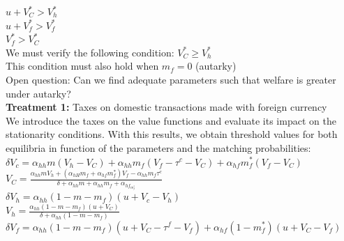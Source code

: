$u + V _ { C } ^* > V_ { h }^ { * }$\\

$u + V _ { f  }^ { * } > V _ { f }^ { * }$\\

$V _ { f  } ^{ * } > V _ { C  }^ { * }$\\

We must verify the following condition: $V _ { C } ^ { * } \geq V_ { h }^ { * }$ \\

This condition must also hold when $m_f=0$ (autarky)\\

Open question: Can we find adequate parameters such that welfare is greater under autarky?\\

\textbf{Treatment 1:} Taxes on domestic transactions made with foreign currency\\

We introduce the taxes on the value functions and evaluate its impact on the stationarity conditions. With this results, we obtain threshold values for both equilibria in function of the parameters and the matching probabilities: \\

$\delta V _ { c } = \alpha _ { h h } m \left( V _ { h } - V _ { C } \right) + \alpha_{h h} m _ { f } \left( V _ { f } - \tau ^ { c } - V _ { C } \right) + \alpha _ { h f } m _ { f } ^* \left( V _ { f } - V _ { C } \right)$\\

$V _ { C } = \frac { \alpha_{h h }m V_h + \left( \alpha _{h H} m _ { f } + \alpha  _ { hf } m _ { f }^* \right) V _ { f } - \alpha _{h h} m _ { f } \tau^c } { \delta +\alpha_{hh}m+\alpha_{hh}m_f+\alpha_{hf}_m_f^*}$\\

$\delta V _ { h } = \alpha _{ hh } \left( 1 - m - m _ { f } \right) \left( u + V _ { c } - V_ h \right)$\\

$V_h = \frac { \alpha_{h h} \left( 1 - m - m _ { f } \right) ( u + V_C ) } { \delta + \alpha_{ h h} ( 1 - m - m_f ) }$\\

$ \delta V _ { f }  = \alpha _ { h h } \left( 1 - m - m _ { f } \right) \left( u + V _ { C } - \tau ^ { f } - V _ { f } \right) + \alpha _ { hf } \left( 1 - m _ { f } ^ { * } \right) \left( u + V _ { C } - V _ { f } \right)$ \\


